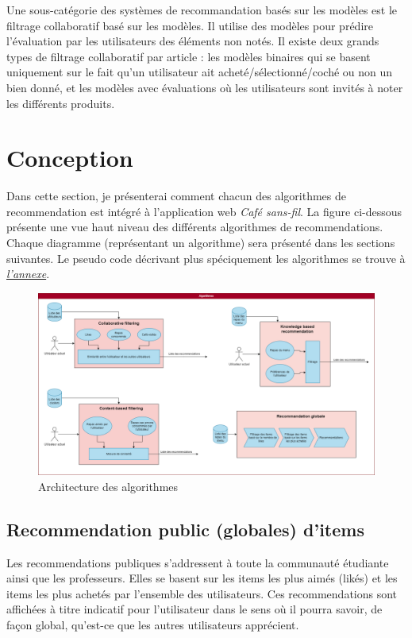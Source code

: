 \documentclass[11pt]{article}
\begin{document}
Une sous-catégorie des systèmes de recommandation basés sur les modèles est le filtrage collaboratif basé sur les modèles. Il utilise des modèles pour prédire l’évaluation par les utilisateurs des éléments non notés. Il existe deux grands types de filtrage collaboratif par article : les modèles binaires qui se basent uniquement sur le fait qu’un utilisateur ait acheté/sélectionné/coché ou non un bien donné, et les modèles avec évaluations où les utilisateurs sont invités à noter les différents produits.



\newpage
\section{Conception}
Dans cette section, je présenterai comment chacun des algorithmes de recommendation est intégré à l'application web \textit{Café sans-fil}. La figure ci-dessous présente une vue haut niveau des différents algorithmes de recommendations. Chaque diagramme (représentant un algorithme) sera présenté dans les sections suivantes. Le pseudo code décrivant plus spéciquement les algorithmes se trouve à \hyperref[annexe]{\textit{l'annexe}}.
\begin{figure}[h]
%
\includegraphics[scale=0.3]{Pipeline.drawio.png} 
\caption{Architecture des algorithmes}
\end{figure}

\subsection{Recommendation public (globales) d'items}
Les recommendations publiques s'addressent à toute la communauté étudiante ainsi que les professeurs. Elles se basent sur les items les plus aimés (likés) et les items les plus achetés par l'ensemble des utilisateurs. Ces recommendations sont affichées à titre indicatif pour l'utilisateur dans le sens où il pourra savoir, de façon global, qu'est-ce que les autres utilisateurs apprécient.\\
\end{document}
